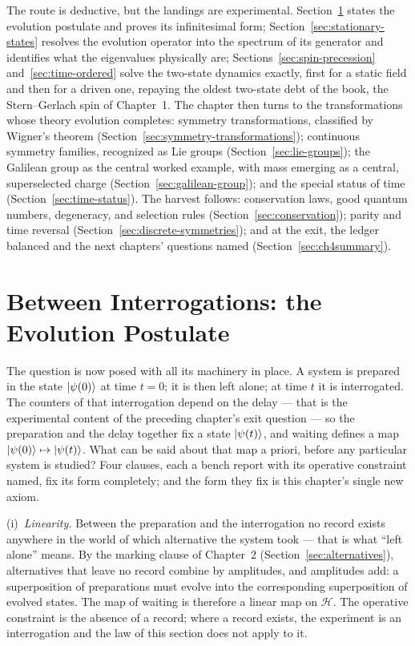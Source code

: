 The route is deductive, but the landings are experimental. Section~\ref{sec:evolution-postulate} states the evolution postulate and proves its infinitesimal form; Section~\ref{sec:stationary-states} resolves the evolution operator into the spectrum of its generator and identifies what the eigenvalues physically are; Sections~\ref{sec:spin-precession} and~\ref{sec:time-ordered} solve the two-state dynamics exactly, first for a static field and then for a driven one, repaying the oldest two-state debt of the book, the Stern--Gerlach spin of Chapter~1. The chapter then turns to the transformations whose theory evolution completes: symmetry transformations, classified by Wigner's theorem (Section~\ref{sec:symmetry-transformations}); continuous symmetry families, recognized as Lie groups (Section~\ref{sec:lie-groups}); the Galilean group as the central worked example, with mass emerging as a central, superselected charge (Section~\ref{sec:galilean-group}); and the special status of time (Section~\ref{sec:time-status}). The harvest follows: conservation laws, good quantum numbers, degeneracy, and selection rules (Section~\ref{sec:conservation}); parity and time reversal (Section~\ref{sec:discrete-symmetries}); and at the exit, the ledger balanced and the next chapters' questions named (Section~\ref{sec:ch4summary}).

\section{Between Interrogations: the Evolution Postulate}
\label{sec:evolution-postulate}

The question is now posed with all its machinery in place. A system is prepared in the state $\ket{\psi(0)}$ at time $t = 0$; it is then left alone; at time $t$ it is interrogated. The counters of that interrogation depend on the delay --- that is the experimental content of the preceding chapter's exit question --- so the preparation and the delay together fix a state $\ket{\psi(t)}$, and waiting defines a map $\ket{\psi(0)} \mapsto \ket{\psi(t)}$. What can be said about that map a priori, before any particular system is studied? Four clauses, each a bench report with its operative constraint named, fix its form completely; and the form they fix is this chapter's single new axiom.

(i)~\emph{Linearity.} Between the preparation and the interrogation no record exists anywhere in the world of which alternative the system took --- that is what ``left alone'' means. By the marking clause of Chapter~2 (Section~\ref{sec:alternatives}), alternatives that leave no record combine by amplitudes, and amplitudes add: a superposition of preparations must evolve into the corresponding superposition of evolved states. The map of waiting is therefore a linear map on $\mathcal{H}$. The operative constraint is the absence of a record; where a record exists, the experiment is an interrogation and the law of this section does not apply to it.

